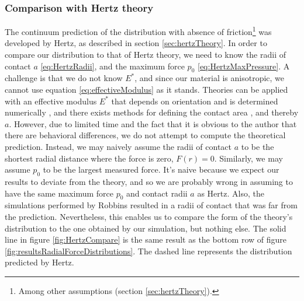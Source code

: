 \documentclass[twoside,english]{uiofysmaster}
\begin{document}
\subsubsection*{Comparison with Hertz theory}
The continuum prediction of the distribution with absence of friction\footnote{Among other assumptions (section \ref{sec:hertzTheory}).} was developed by Hertz, as described in section \ref{sec:hertzTheory}. 
In order to compare our distribution to that of Hertz theory, we need to know the radii of contact $a$ \eqref{eq:HertzRadii}, and the maximum force $p_0$ \eqref{eq:HertzMaxPressure}.
A challenge is that we do not know $E^*$, and since our material is anisotropic, we cannot use equation \eqref{eq:effectiveModulus} as it stands. 
Theories can be applied with an effective modulus $E^*$ that depends on orientation and is determined numerically \cite{Johnson1985},
and there exists methods for defining the contact area \cite{RobbinsDefiningContactAtTheAtomicScale}, and thereby $a$.  
However, due to limited time and the fact that it is obvious to the author that there are behavioral differences, we do not attempt to compute the theoretical prediction.
Instead, we may naively assume the radii of contact $a$ to be the shortest radial distance where the force is zero, $F(r)=0$. 
Similarly, we may assume $p_0$ to be the largest measured force.
It's naive because we expect our results to deviate from the theory, and so we are probably wrong in assuming  %
to have the same maximum force $p_0$ and contact radii $a$ as Hertz. Also, the simulations performed by Robbins resulted in a radii of contact that was far from the prediction. 
Nevertheless, this enables us to compare the form of the theory's distribution to the one obtained by our simulation, but nothing else.
The solid line in figure \ref{fig:HertzCompare} is the same result as the bottom row of figure \ref{fig:resultsRadialForceDistributions}.
The dashed line represents the distribution predicted by Hertz.
\end{document}
